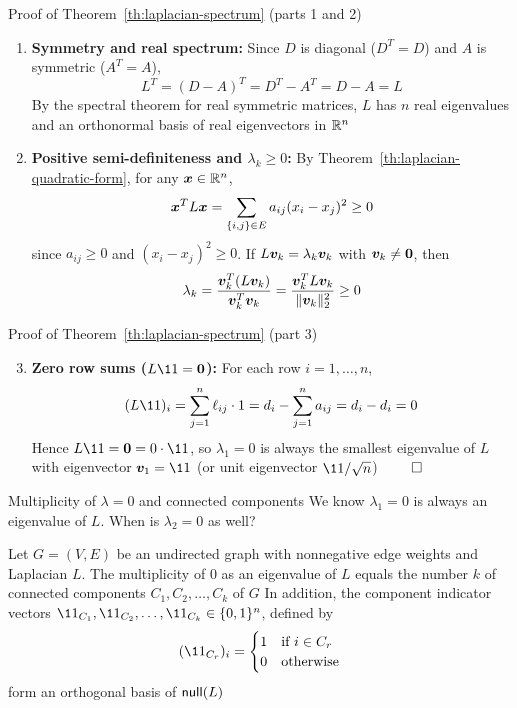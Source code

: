 \documentclass[aspectratio=169]{beamer}\usepackage[]{graphicx}\usepackage[]{xcolor}
\begin{document}
\begin{frame}{Proof of Theorem~\ref{th:laplacian-spectrum} (parts 1 and 2)}
\begin{enumerate}
\item \textbf{Symmetry and real spectrum:} Since $D$ is diagonal ($D^T = D$) and $A$ is symmetric ($A^T = A$),
\[
L^T = (D - A)^T = D^T - A^T = D - A = L
\]
By the spectral theorem for real symmetric matrices, $L$ has $n$ real eigenvalues and an orthonormal basis of real eigenvectors in $\mathbb{R}^n$
\vfill
\item \textbf{Positive semi-definiteness and $\lambda_k \ge 0$:} By Theorem~\ref{th:laplacian-quadratic-form}, for any $\bm{x} \in \mathbb{R}^n$,
\[
\bm{x}^T L \bm{x} = \sum_{\{i, j\} \in E} a_{ij}(x_i - x_j)^2 \ge 0
\]
since $a_{ij} \ge 0$ and $(x_i - x_j)^2 \ge 0$.
If $L\bm{v}_k = \lambda_k \bm{v}_k$ with $\bv_k \neq \b0$, then
\[
\lambda_k = \frac{\bm{v}_k^T (L\bm{v}_k)}{\bm{v}_k^T \bm{v}_k} = \frac{\bm{v}_k^T L \bm{v}_k}{\|\bm{v}_k\|_2^2} \ge 0
\]
\end{enumerate}
\end{frame}


\begin{frame}{Proof of Theorem~\ref{th:laplacian-spectrum} (part 3)}
\begin{enumerate}
\setcounter{enumi}{2}
\item \textbf{Zero row sums ($L\11 = \b0$):} For each row $i = 1, \ldots, n$,
\[
(L\11)_i = \sum_{j=1}^n \ell_{ij} \cdot 1 = d_i - \sum_{j=1}^n a_{ij} = d_i - d_i = 0
\]
Hence $L\11 = \b0 = 0 \cdot \11$, so $\lambda_1 = 0$ is always the smallest eigenvalue of $L$ with eigenvector $\bv_1 = \11$ (or unit eigenvector $\11 / \sqrt{n}$) \hfill $\qed$
\end{enumerate}
\end{frame}


\begin{frame}{Multiplicity of $\lambda = 0$ and connected components}
We know $\lambda_1 = 0$ is always an eigenvalue of $L$. When is $\lambda_2 = 0$ as well?
\vfill
\begin{importanttheorem}[Multiplicity of $0$ = \# connected components]
\label{th:zero-eigenvalues-components}
Let $G = (V, E)$ be an undirected graph with nonnegative edge weights and Laplacian $L$. The multiplicity of $0$ as an eigenvalue of $L$ equals the number $k$ of connected components $C_1, C_2, \ldots, C_k$ of $G$
\vskip0.2cm
In addition, the component indicator vectors $\11_{C_1}, \11_{C_2}, \ldots, \11_{C_k} \in \{0, 1\}^n$, defined by
\[
(\11_{C_r})_i = \begin{cases}
1 & \text{if } i \in C_r \\
0 & \text{otherwise}
\end{cases}
\]
form an orthogonal basis of $\mathsf{null}(L)$
\end{importanttheorem}
\end{frame}
\end{document}
